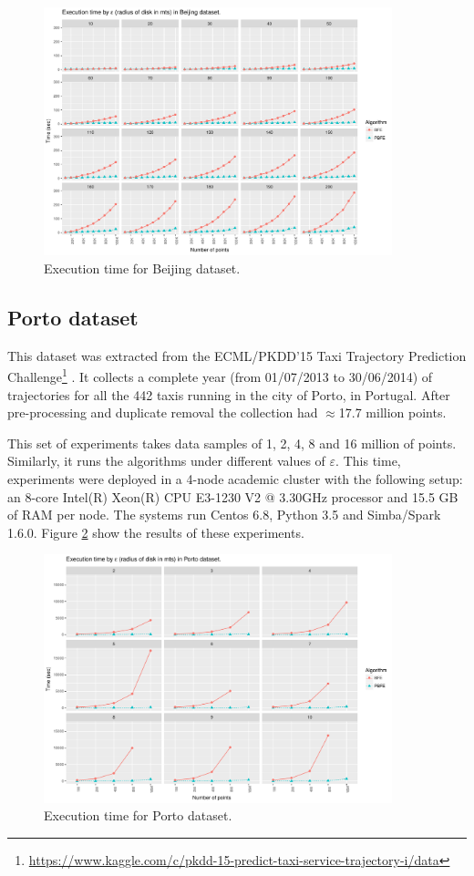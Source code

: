 \documentclass[12pt]{scrartcl}
\begin{document}
\begin{figure}
 \centering
 \includegraphics[width=0.9\textwidth]{figures/beijing} 
 \caption{Execution time for Beijing dataset.}
 \label{fig:beijing}
\end{figure}

\subsection{Porto dataset}
This dataset was extracted from the ECML/PKDD'15 Taxi Trajectory Prediction Challenge\footnote{\url{https://www.kaggle.com/c/pkdd-15-predict-taxi-service-trajectory-i/data}} \citep{lam_blue_2015, moreira-matias_predicting_2013}.  It collects a complete year (from 01/07/2013 to 30/06/2014) of trajectories for all the 442 taxis running in the city of Porto, in Portugal. After pre-processing and duplicate removal the collection had $\approx$17.7 million points.

This set of experiments takes data samples of 1, 2, 4, 8 and 16 million of points.  Similarly, it runs the algorithms under different values of $\varepsilon$.  This time, experiments were deployed in a 4-node academic cluster with the following setup: an 8-core Intel(R) Xeon(R) CPU E3-1230 V2 @ 3.30GHz processor and 15.5 GB of RAM per node.  The systems run Centos 6.8, Python 3.5 and Simba/Spark 1.6.0.  Figure \ref{fig:porto} show the results of these experiments.

\begin{figure}
 \centering
 \includegraphics[width=0.9\textwidth]{figures/porto} 
 \caption{Execution time for Porto dataset.}
 \label{fig:porto}
\end{figure}
\end{document}
